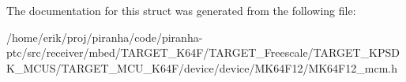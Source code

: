 The documentation for this struct was generated from the following file\+:\begin{DoxyCompactItemize}
\item 
/home/erik/proj/piranha/code/piranha-\/ptc/src/receiver/mbed/\+T\+A\+R\+G\+E\+T\+\_\+\+K64\+F/\+T\+A\+R\+G\+E\+T\+\_\+\+Freescale/\+T\+A\+R\+G\+E\+T\+\_\+\+K\+P\+S\+D\+K\+\_\+\+M\+C\+U\+S/\+T\+A\+R\+G\+E\+T\+\_\+\+M\+C\+U\+\_\+\+K64\+F/device/device/\+M\+K64\+F12/M\+K64\+F12\+\_\+mcm.\+h\end{DoxyCompactItemize}
